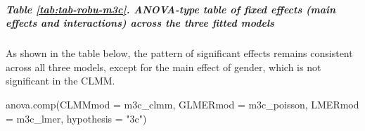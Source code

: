 \documentclass[
  bookmarksnumbered]{article}
\newenvironment{Shaded}{\begin{snugshade}}{\end{snugshade}}
\newcommand{\AttributeTok}[1]{\textcolor[rgb]{0.80,0.80,0.80}{#1}}
\newcommand{\FunctionTok}[1]{\textcolor[rgb]{0.94,0.94,0.56}{#1}}
\newcommand{\NormalTok}[1]{\textcolor[rgb]{0.80,0.80,0.80}{#1}}
\newcommand{\StringTok}[1]{\textcolor[rgb]{0.80,0.58,0.58}{#1}}
\begin{document}
\subparagraph{Table \ref{tab:tab-robu-m3c}. ANOVA-type table of fixed effects (main effects and interactions) across the three fitted models}\label{table-reftabtab-robu-m3c.-anova-type-table-of-fixed-effects-main-effects-and-interactions-across-the-three-fitted-models}

As shown in the table below, the pattern of significant effects remains consistent across all three models, except for the main effect of gender, which is not significant in the CLMM.

\begin{Shaded}
\begin{Highlighting}[]
\FunctionTok{anova.comp}\NormalTok{(}\AttributeTok{CLMMmod =}\NormalTok{ m3c\_clmm, }\AttributeTok{GLMERmod =}\NormalTok{ m3c\_poisson, }\AttributeTok{LMERmod =}\NormalTok{ m3c\_lmer, }\AttributeTok{hypothesis =} \StringTok{"3c"}\NormalTok{)}
\end{Highlighting}
\end{Shaded}
\end{document}
